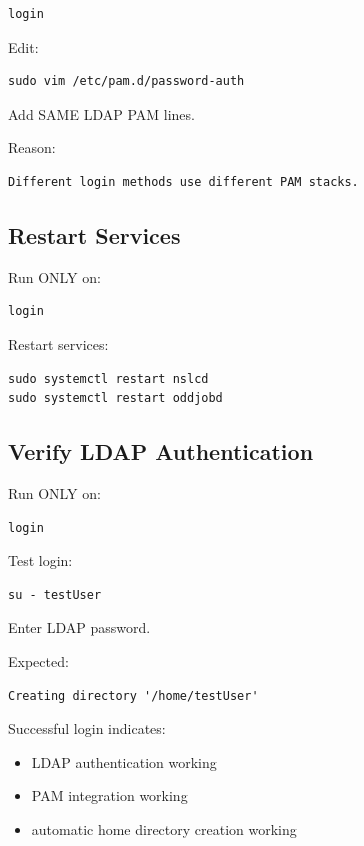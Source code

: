 \documentclass[11pt]{article}
\begin{document}
\begin{verbatim}
login
\end{verbatim}

Edit:

\begin{verbatim}
sudo vim /etc/pam.d/password-auth
\end{verbatim}

Add SAME LDAP PAM lines.

Reason:

\begin{verbatim}
Different login methods use different PAM stacks.
\end{verbatim}
\subsection{Restart Services}
\label{sec:orgb47c123}

Run ONLY on:

\begin{verbatim}
login
\end{verbatim}

Restart services:

\begin{verbatim}
sudo systemctl restart nslcd
sudo systemctl restart oddjobd
\end{verbatim}
\subsection{Verify LDAP Authentication}
\label{sec:org9592e35}

Run ONLY on:

\begin{verbatim}
login
\end{verbatim}

Test login:

\begin{verbatim}
su - testUser
\end{verbatim}

Enter LDAP password.

Expected:

\begin{verbatim}
Creating directory '/home/testUser'
\end{verbatim}

Successful login indicates:

\begin{itemize}
\item LDAP authentication working
\item PAM integration working
\item automatic home directory creation working
\end{itemize}
\end{document}
